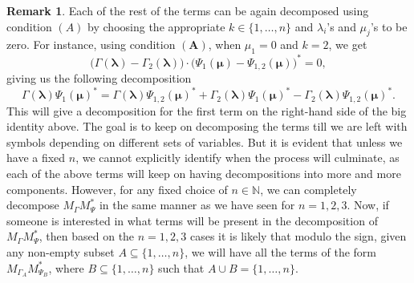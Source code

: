 \documentclass[12pt]{amsart}
\theoremstyle{definition}
\newtheorem{rem}{Remark}[section]
\newcommand{\Nat}{\mathbb{N}}
\newcommand{\1}{{\mbox{\bf 1}}}
\begin{document}
\begin{rem}
Each of the rest of the terms can be again decomposed using condition $(A)$ by choosing the appropriate $k \in \{1,\ldots,n\}$ and $\lambda_i$'s and $\mu_j$'s to be zero.  For instance,  using condition $(\textbf{A})$, when $\mu_1=0$ and $k=2$, we get
\[
\big(\Gamma (\bm{\lambda})  - \Gamma_2 (\bm{\lambda})  \big) \cdot \big( \Psi_1( \bm{\mu}) - \Psi_{1,2}( \bm{\mu}) \big)^* =0,
\]
giving us the following decomposition
\[
\Gamma(\bm{\lambda}) \Psi_1(\bm{\mu})^* =  \Gamma(\bm{\lambda}) \Psi_{1,2}( \bm{\mu})^* + 
\Gamma_2 (\bm{\lambda})   \Psi_{1}(\bm{\mu})^* 
- \Gamma_2 (\bm{\lambda}) \Psi_{1,2}( \bm{\mu})^*.
\]
This will give a decomposition for the first term on the right-hand side of the big identity above.  The goal is to keep on decomposing the terms till we are left with symbols depending on different sets of variables. But it is evident that unless we have a fixed $n$, we cannot explicitly identify when the process will culminate, as each of the above terms will keep on having decompositions into more and more components. However, for any fixed choice of $n \in \Nat$, we can completely decompose $M_{\Gamma}M_{\Psi}^*$ in the same manner as we have seen for $n=1,2,3$.  Now, if someone is interested in what terms will be present in the decomposition of $M_{\Gamma}M_{\Psi}^*$, then based on the $n=1,2,3$ cases it is likely that modulo the sign, given any non-empty subset $A \subseteq \{1,\ldots,n\}$, we will have all the terms of the form $M_{\Gamma_A} M_{\Psi_B}^*$, where $B \subseteq \{1,\ldots,n\}$ such that $A \cup B = \{1,\ldots,n\}$.
\end{rem}
\end{document}
